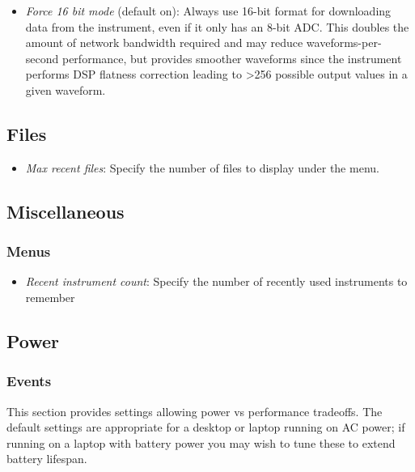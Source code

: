 \begin{itemize}
\item \emph{Force 16 bit mode} (default on): Always use 16-bit format for downloading data from the instrument, even if
it only has an 8-bit ADC. This doubles the amount of network bandwidth required and may reduce waveforms-per-second
performance, but provides smoother waveforms since the instrument performs DSP flatness correction leading to >256
possible output values in a given waveform.
\end{itemize}

\subsection{Files}

\begin{itemize}
\item \emph{Max recent files}: Specify the number of files to display under the  menu.
\end{itemize}

\subsection{Miscellaneous}

\subsubsection{Menus}

\begin{itemize}
\item \emph{Recent instrument count}: Specify the number of recently used instruments to remember
\end{itemize}

\subsection{Power}

\subsubsection{Events}

This section provides settings allowing power vs performance tradeoffs. The default settings are appropriate for a
desktop or laptop running on AC power; if running on a laptop with battery power you may wish to tune these to extend
battery lifespan.

